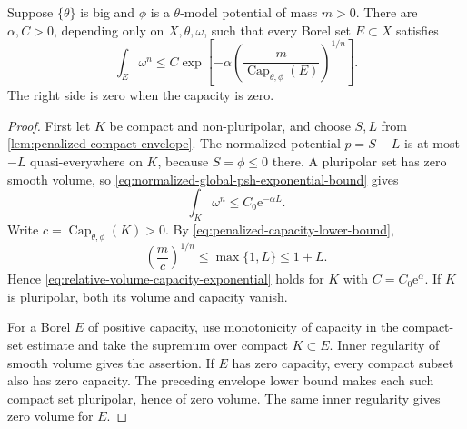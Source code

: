 \begin{proposition}\label{prop:relative-volume-capacity-exponential}
Suppose $\{\theta\}$ is big and $\phi$ is a $\theta$-model potential of mass $m>0$. There are $\alpha,C>0$, depending only on $X,\theta,\omega$, such that every Borel set $E\subset X$ satisfies
\begin{equation}\label{eq:relative-volume-capacity-exponential}
 \int_E\omega^n\leq C\exp\left[-\alpha
       \left(\frac{m}{\operatorname{Cap}_{\theta,\phi}(E)}\right)^{1/n}\right].
\end{equation}
The right side is zero when the capacity is zero.
\end{proposition}
\begin{proof}
First let $K$ be compact and non-pluripolar, and choose $S,L$ from \cref{lem:penalized-compact-envelope}. The normalized potential $p=S-L$ is at most $-L$ quasi-everywhere on $K$, because $S=\phi\leq0$ there. A pluripolar set has zero smooth volume, so \eqref{eq:normalized-global-psh-exponential-bound} gives
\[
 \int_K\omega^n\leq C_0\mathrm e^{-\alpha L}.
\]
Write $c=\operatorname{Cap}_{\theta,\phi}(K)>0$. By \eqref{eq:penalized-capacity-lower-bound},
\[
 \left(\frac mc\right)^{1/n}\leq\max\{1,L\}\leq1+L.
\]
Hence \eqref{eq:relative-volume-capacity-exponential} holds for $K$ with $C=C_0\mathrm e^\alpha$. If $K$ is pluripolar, both its volume and capacity vanish.

For a Borel $E$ of positive capacity, use monotonicity of capacity in the compact-set estimate and take the supremum over compact $K\subset E$. Inner regularity of smooth volume gives the assertion. If $E$ has zero capacity, every compact subset also has zero capacity. The preceding envelope lower bound makes each such compact set pluripolar, hence of zero volume. The same inner regularity gives zero volume for $E$.
\end{proof}

